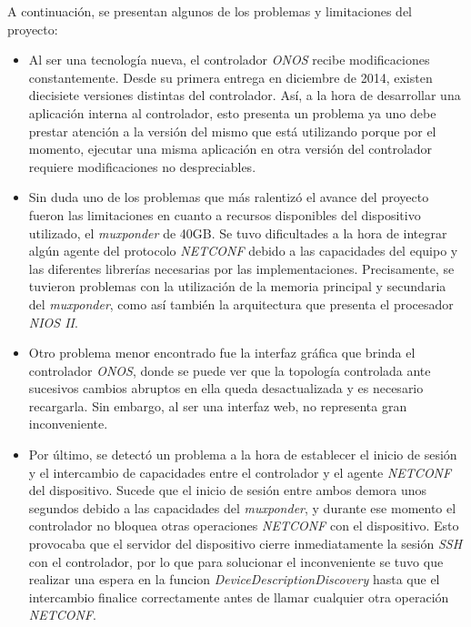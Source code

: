 A continuación, se presentan algunos de los problemas y limitaciones del proyecto:

\begin{itemize}
    
    \item Al ser una tecnología nueva, el controlador \textit{ONOS} recibe modificaciones constantemente. Desde su primera entrega en diciembre de 2014, existen diecisiete versiones distintas del controlador. Así, a la hora de desarrollar una aplicación interna al controlador, esto presenta un problema ya uno debe prestar atención a la versión del mismo que está utilizando porque por el momento, ejecutar una misma aplicación en otra versión del controlador requiere modificaciones no despreciables.     
    
    \item Sin duda uno de los problemas que más ralentizó el avance del proyecto fueron las limitaciones en cuanto a recursos disponibles del dispositivo utilizado, el \textit{muxponder} de 40GB. Se tuvo dificultades a la hora de integrar algún agente del protocolo \textit{NETCONF} debido a las capacidades del equipo y las diferentes librerías necesarias por las implementaciones. Precisamente, se tuvieron problemas con la utilización de la memoria principal y secundaria del \textit{muxponder}, como así también la arquitectura que presenta el procesador \textit{NIOS II}.

    \item Otro problema menor encontrado fue la interfaz gráfica que brinda el controlador \textit{ONOS}, donde se puede ver que la topología controlada ante sucesivos cambios abruptos en ella queda desactualizada y es necesario recargarla. Sin embargo, al ser una interfaz web, no representa gran inconveniente.
    
    \item Por último, se detectó un problema a la hora de establecer el inicio de sesión y el intercambio de capacidades entre el controlador y el agente \textit{NETCONF} del dispositivo. Sucede que el inicio de sesión entre ambos demora unos segundos debido a las capacidades del \textit{muxponder}, y durante ese momento el controlador no bloquea otras operaciones \textit{NETCONF} con el dispositivo. Esto provocaba que el servidor del dispositivo cierre inmediatamente la sesión \textit{SSH} con el controlador, por lo que para solucionar el inconveniente se tuvo que realizar una espera en la funcion \textit{DeviceDescriptionDiscovery} hasta que el intercambio finalice correctamente antes de llamar cualquier otra operación \textit{NETCONF}.
    
\end{itemize}


